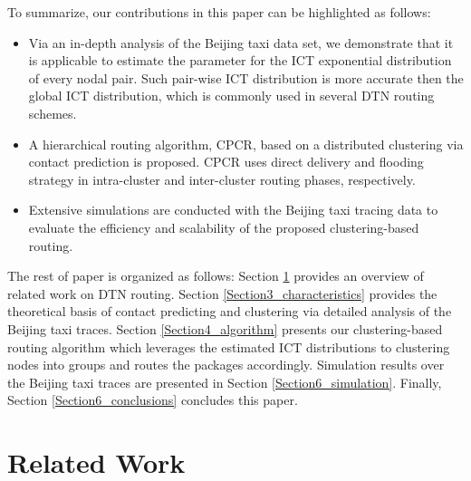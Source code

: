 \documentclass[conference]{IEEEtran}
\begin{document}
To summarize, our contributions in this paper can be highlighted as follows:
    \begin{itemize}
      \item
         Via an in-depth analysis of the Beijing taxi data set, we demonstrate that it is applicable to estimate the parameter for the ICT exponential distribution of every nodal pair. Such pair-wise ICT distribution is more accurate then the global ICT distribution, which is commonly used in several DTN routing schemes.
      \item
         A hierarchical routing algorithm, CPCR, based on a distributed clustering via contact prediction is proposed.  CPCR uses direct delivery and flooding strategy in intra-cluster and inter-cluster routing phases, respectively.
      \item %
        Extensive simulations are conducted with the Beijing taxi tracing data to evaluate the efficiency and scalability of the proposed clustering-based routing.
    \end{itemize}

The rest of paper is organized as follows: Section \ref{Section2_relatedwork} provides an overview of related work on DTN routing.
Section \ref{Section3_characteristics} provides the theoretical basis of contact predicting and clustering via detailed analysis of the Beijing taxi traces. Section \ref{Section4_algorithm} presents our clustering-based routing algorithm which leverages the estimated ICT distributions to clustering nodes into groups and routes the packages accordingly. Simulation results over the Beijing taxi traces are presented in Section \ref{Section6_simulation}. Finally, Section \ref{Section6_conclusions} concludes this paper.


\section{Related Work}
\label{Section2_relatedwork}
\end{document}
